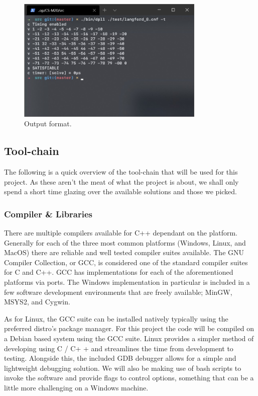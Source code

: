 \documentclass{article}
\begin{document}
\begin{figure}[h]
    \centering
    \includegraphics[width=0.8\textwidth]{output_example.jpg}
    \caption{Output format.}
\end{figure}

\subsection{Tool-chain}
The following is a quick overview of the tool-chain that will be used for this project. As these aren't the meat of what the
project is about, we shall only spend a short time glazing over the available solutions and those we picked.

\subsubsection{Compiler \& Libraries}
There are multiple compilers available for C++ dependant on the platform. Generally for each of the three most common platforms
(Windows, Linux, and MacOS) there are reliable and well tested compiler suites available. The GNU Compiler Collection, or GCC, is
considered one of the standard compiler suites for C and C++. GCC has implementations for each of the aforementioned platforms
via ports. The Windows implementation in particular is included in a few software development environments that are freely
available; MinGW, MSYS2, and Cygwin.

As for Linux, the GCC suite can be installed natively typically using the preferred distro's package manager. For this project the
code will be compiled on a Debian based system using the GCC suite. Linux provides a simpler method of developing using C / C+
+ and streamlines the time from development to testing. Alongside this, the included GDB debugger allows for a simple and
lightweight debugging solution. We will also be making use of bash scripts to invoke the software and provide flags to control
options, something that can be a little more challenging on a Windows machine.
\end{document}
